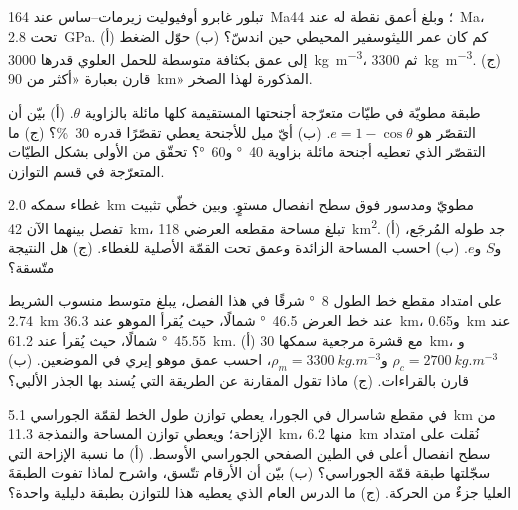 \begin{exercise}[$\star\star$]\label{exo:b2:alpine-orogen:6}
تبلور غابرو أوفيوليت زيرمات--ساس عند \qty{164}{Ma}؛ وبلغ 
أعمق نقطة له عند \qty{44}{Ma}، تحت \qty{2.8}{GPa}. (أ) كم كان عمر الليثوسفير
المحيطي حين اندسّ؟ (ب) حوّل الضغط إلى عمق بكثافة متوسطة للحمل العلوي
قدرها \qty{3000}{kg.m^{-3}}، ثم \qty{3300}{kg.m^{-3}}. (ج) قارن بعبارة
«أكثر من \qty{90}{km}» المذكورة لهذا الصخر.
\end{exercise}

\begin{exercise}[$\star\star$]\label{exo:b2:alpine-orogen:7}
طبقة مطويّة في طيّات متعرّجة أجنحتها المستقيمة كلها مائلة بالزاوية $\theta$.
(أ) بيّن أن التقصّر هو $e = 1 - \cos\theta$. (ب) أيّ ميل للأجنحة يعطي
تقصّرًا قدره \qty{30}{\percent}؟ (ج) ما التقصّر الذي تعطيه أجنحة مائلة بزاوية \qty{40}{\degree}
و\qty{60}{\degree}؟ تحقّق من الأولى بشكل الطيّات المتعرّجة في قسم التوازن.
\end{exercise}

\begin{exercise}[$\star\star$]\label{exo:b2:alpine-orogen:8}
غطاء سمكه \qty{2.0}{km} مطويّ ومدسور فوق سطح انفصال مستوٍ. وبين خطّي تثبيت
تفصل بينهما الآن \qty{42}{km}، تبلغ مساحة مقطعه العرضي \qty{118}{km^2}. (أ) جد طوله
المُرجَع، و$S$ و$e$. (ب) احسب المساحة الزائدة وعمق  تحت
القمّة الأصلية للغطاء. (ج) هل النتيجة متّسقة؟
\end{exercise}

\begin{exercise}[$\star\star$]\label{exo:b2:alpine-orogen:9}
على امتداد مقطع خط الطول \qty{8}{\degree} شرقًا في هذا الفصل، يبلغ متوسط منسوب الشريط
\qty{2.74}{km} عند خط العرض \qty{46.5}{\degree} شمالًا، حيث يُقرأ الموهو عند \qty{36.3}{km}،
و\qty{0.65}{km} عند \qty{45.55}{\degree} شمالًا، حيث يُقرأ عند \qty{61.2}{km}. (أ) مع
قشرة مرجعية سمكها \qty{30}{km}، و$\rho_c = \qty{2700}{kg.m^{-3}}$ و$\rho_m =
\qty{3300}{kg.m^{-3}}$، احسب عمق موهو إيري في الموضعين. (ب) قارن
بالقراءات. (ج) ماذا تقول المقارنة عن الطريقة التي يُسند بها الجذر الألبي؟
\end{exercise}

\begin{exercise}[$\star\star\star$]\label{exo:b2:alpine-orogen:10}
في مقطع شاسرال في الجورا، يعطي توازن طول الخط لقمّة الجوراسي
\qty{5.1}{km} من الإزاحة؛ ويعطي توازن المساحة والنمذجة \qty{11.3}{km}، منها
\qty{6.2}{km} نُقلت على امتداد سطح انفصال أعلى في الطين الصفحي الجوراسي الأوسط.
(أ) ما نسبة الإزاحة التي سجّلتها طبقة قمّة الجوراسي؟ (ب) بيّن أن
الأرقام تتّسق، واشرح لماذا تفوت الطبقةَ العليا جزءٌ من الحركة. (ج) ما
الدرس العام الذي يعطيه هذا للتوازن بطبقة دليلية واحدة؟
\end{exercise}

